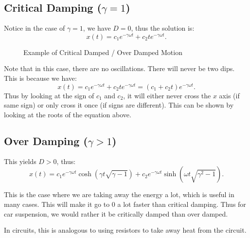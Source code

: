 \documentclass[../main/main.tex]{subfiles}
\begin{document}
\subsection{Critical Damping ($\gamma=1$)} 
Notice in the case of $\gamma=1$, we have $D=0$, thus the solution is:  \[
	x(t) = c_1 e^{-\gamma\omega t}+c_2te^{-\gamma\omega t}
.\] 
\begin{figure}[htpb]
	\centering
	\caption{ Example of Critical Damped / Over Damped Motion}
	\label{fig:}
\end{figure}
\begin{remark}
	Note that in this case, there are no oscillations. There will never be two dips. This is because we have: \[
		x(t) = c_1e^{-\gamma\omega t}+c_2te^{-\gamma\omega t} = (c_1+c_2 t)e^{-\gamma\omega t}
	.\]  Thus by looking at the sign of $c_1$ and $c_2$, it will either never cross the $x$ axis (if same sign) or only cross it once (if signs are different). This can be shown by looking at the roots of the equation above.
\end{remark}

\subsection{Over Damping ($\gamma>1$)}
This yields $D>0$, thus: \[
	x(t) = c_1e^{-\gamma\omega t} \cosh(\gamma t\sqrt{\gamma-1} ) + c_2 e^{-\gamma\omega t}\sinh(\omega t\sqrt{\gamma^2-1} )
.\] 
\begin{remark}
	This is the case where we are taking away the energy a lot, which is useful in many cases. This will make it go to 0 a lot faster than critical damping. Thus for car suspension, we would rather it be critically damped than over damped.
\end{remark}

\begin{remark}
	In circuits, this is analogous to using resistors to take away heat from the circuit.
\end{remark}
\end{document}

